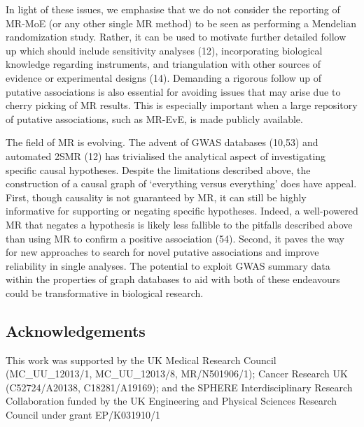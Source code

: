 \documentclass[]{article}
\begin{document}
In light of these issues, we emphasise that we do not consider the
reporting of MR-MoE (or any other single MR method) to be seen as
performing a Mendelian randomization study. Rather, it can be used to
motivate further detailed follow up which should include sensitivity
analyses (12), incorporating biological knowledge regarding instruments,
and triangulation with other sources of evidence or experimental designs
(14). Demanding a rigorous follow up of putative associations is also
essential for avoiding issues that may arise due to cherry picking of MR
results. This is especially important when a large repository of
putative associations, such as MR-EvE, is made publicly available.

The field of MR is evolving. The advent of GWAS databases (10,53) and
automated 2SMR (12) has trivialised the analytical aspect of
investigating specific causal hypotheses. Despite the limitations
described above, the construction of a causal graph of `everything
versus everything' does have appeal. First, though causality is not
guaranteed by MR, it can still be highly informative for supporting or
negating specific hypotheses. Indeed, a well-powered MR that negates a
hypothesis is likely less fallible to the pitfalls described above than
using MR to confirm a positive association (54). Second, it paves the
way for new approaches to search for novel putative associations and
improve reliability in single analyses. The potential to exploit GWAS
summary data within the properties of graph databases to aid with both
of these endeavours could be transformative in biological research.

\subsection{Acknowledgements}\label{acknowledgements}

This work was supported by the UK Medical Research Council
(MC\_UU\_12013/1, MC\_UU\_12013/8, MR/N501906/1); Cancer Research UK
(C52724/A20138, C18281/A19169); and the SPHERE Interdisciplinary
Research Collaboration funded by the UK Engineering and Physical
Sciences Research Council under grant EP/K031910/1

\newpage
\end{document}
